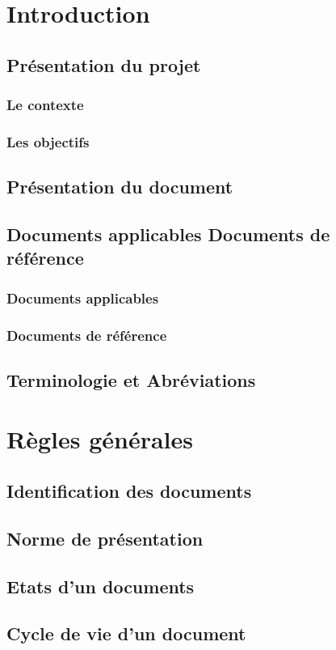 \section{Introduction}
  \subsection{Présentation du projet}
    \subsubsection{Le contexte}
    \subsubsection{Les objectifs}
  \subsection{Présentation du document}
  \subsection{Documents applicables Documents de référence}
    \subsubsection{Documents applicables}
    \subsubsection{Documents de référence}
  \subsection{Terminologie et Abréviations}
\section{Règles générales}
  \subsection{Identification des documents}
  \subsection{Norme de présentation}
  \subsection{Etats d'un documents}
  \subsection{Cycle de vie d'un document}
